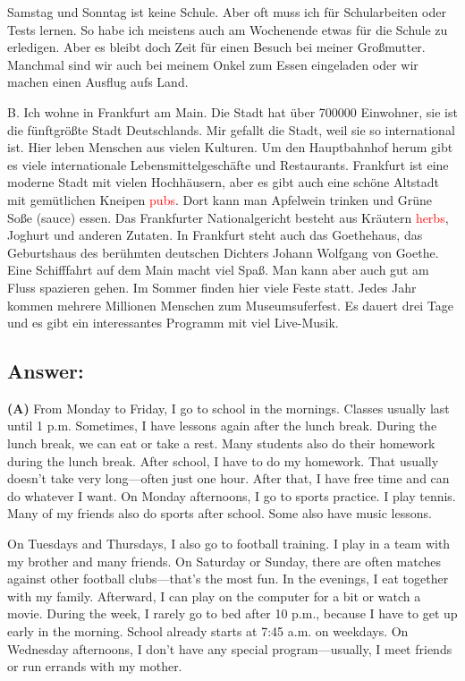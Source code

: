 \documentclass[a4paper,12pt]{article}
\begin{document}
Samstag und Sonntag ist keine Schule. Aber oft muss ich für Schularbeiten oder Tests lernen. So habe ich meistens auch am Wochenende etwas für die Schule zu erledigen. Aber es bleibt doch Zeit für einen Besuch bei meiner Großmutter. Manchmal sind wir auch bei meinem Onkel zum Essen eingeladen oder wir machen einen Ausflug aufs Land.

B. Ich wohne in Frankfurt am Main. Die Stadt hat über 700000 Einwohner, sie ist die fünftgrößte Stadt Deutschlands. Mir gefallt die Stadt, weil sie so international ist. Hier leben Menschen aus vielen Kulturen. Um den Hauptbahnhof herum gibt es viele internationale Lebensmittelgeschäfte und Restaurants. Frankfurt ist eine moderne Stadt mit vielen Hochhäusern, aber es gibt auch eine schöne Altstadt mit gemütlichen Kneipen \textcolor{red}{pubs}. Dort kann man Apfelwein trinken und Grüne Soße (sauce) essen. Das Frankfurter Nationalgericht besteht aus Kräutern \textcolor{red}{herbs}, Joghurt und anderen Zutaten. In Frankfurt steht auch das Goethehaus, das Geburtshaus des berühmten deutschen Dichters Johann Wolfgang von Goethe. Eine Schifffahrt auf dem Main macht viel Spaß. Man kann aber auch gut am Fluss spazieren gehen. Im Sommer finden hier viele Feste statt. Jedes Jahr kommen mehrere Millionen Menschen zum Museumsuferfest. Es dauert drei Tage und es gibt ein interessantes Programm mit viel Live-Musik.

\subsection*{Answer:}

\textbf{(A)} From Monday to Friday, I go to school in the mornings. Classes usually last until 1 p.m. Sometimes, I have lessons again after the lunch break. During the lunch break, we can eat or take a rest. Many students also do their homework during the lunch break. After school, I have to do my homework. That usually doesn't take very long—often just one hour. After that, I have free time and can do whatever I want. On Monday afternoons, I go to sports practice. I play tennis. Many of my friends also do sports after school. Some also have music lessons.

On Tuesdays and Thursdays, I also go to football training. I play in a team with my brother and many friends. On Saturday or Sunday, there are often matches against other football clubs—that’s the most fun. In the evenings, I eat together with my family. Afterward, I can play on the computer for a bit or watch a movie. During the week, I rarely go to bed after 10 p.m., because I have to get up early in the morning. School already starts at 7:45 a.m. on weekdays. On Wednesday afternoons, I don’t have any special program—usually, I meet friends or run errands with my mother.
\end{document}
